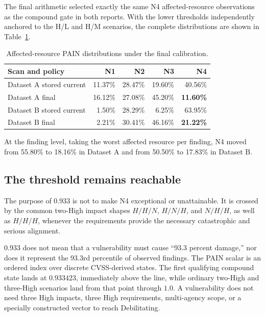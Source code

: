 \documentclass[11pt]{article}
\begin{document}
The final arithmetic selected exactly the same N4 affected-resource observations
as the compound gate in both reports. With the lower thresholds independently
anchored to the H/L and H/M scenarios, the complete distributions are shown in
Table~\ref{tab:distribution}.

\begin{table}[H]
\centering
\small
\renewcommand{\arraystretch}{1.15}
\begin{tabular}{@{}lrrrr@{}}
\toprule
\textbf{Scan and policy} & \textbf{N1} & \textbf{N2} & \textbf{N3} & \textbf{N4} \\
\midrule
Dataset A stored current & 11.37\% & 28.47\% & 19.60\% & 40.56\% \\
Dataset A final & 16.12\% & 27.08\% & 45.20\% & \textbf{11.60\%} \\
Dataset B stored current & 1.50\% & 28.29\% & 6.25\% & 63.95\% \\
Dataset B final & 2.21\% & 30.41\% & 46.16\% & \textbf{21.22\%} \\
\bottomrule
\end{tabular}
\caption{Affected-resource PAIN distributions under the final calibration.}
\label{tab:distribution}
\end{table}

At the finding level, taking the worst affected resource per finding, N4 moved
from 55.80\% to 18.16\% in Dataset A and from 50.50\% to 17.83\% in Dataset B.

\subsection{The threshold remains reachable}

The purpose of $0.933$ is not to make N4 exceptional or unattainable. It is crossed
by the common two-High impact shapes $H/H/N$, $H/N/H$, and $N/H/H$, as well as
$H/H/H$, whenever the requirements provide the necessary catastrophic and serious
alignment.

\begin{plain}
$0.933$ does not mean that a vulnerability must cause ``93.3 percent damage,'' nor
does it represent the 93.3rd percentile of observed findings. The PAIN scalar is an
ordered index over discrete CVSS-derived states. The first qualifying compound state
lands at $0.933423$, immediately above the line, while ordinary two-High and
three-High scenarios land from that point through $1.0$. A vulnerability does not
need three High impacts, three High requirements, multi-agency scope, or a specially
constructed vector to reach Debilitating.
\end{plain}
\end{document}
